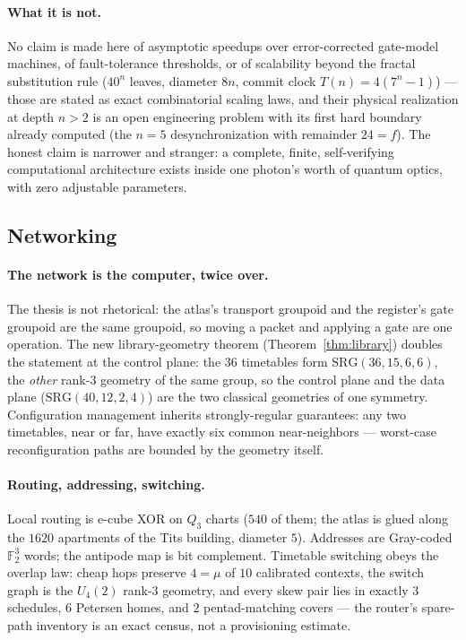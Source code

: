 \documentclass[11pt]{article}
\newcommand{\GF}[1]{\mathbb{F}_{#1}}
\begin{document}
\paragraph{What it is not.}  No claim is made here of asymptotic
speedups over error-corrected gate-model machines, of fault-tolerance
thresholds, or of scalability beyond the fractal substitution rule
($40^n$ leaves, diameter $8n$, commit clock $T(n)=4(7^n-1)$) ---
those are stated as exact combinatorial scaling laws, and their
physical realization at depth $n>2$ is an open engineering problem
with its first hard boundary already computed (the $n=5$
desynchronization with remainder $24=f$).  The honest claim is
narrower and stranger: a complete, finite, self-verifying
computational architecture exists inside one photon's worth of
quantum optics, with zero adjustable parameters.

\subsection{Networking}

\paragraph{The network is the computer, twice over.}  The thesis is
not rhetorical: the atlas's transport groupoid and the register's
gate groupoid are the same groupoid, so moving a packet and applying
a gate are one operation.  The new library-geometry theorem
(Theorem~\ref{thm:library}) doubles the statement at the control
plane: the $36$ timetables form $\mathrm{SRG}(36,15,6,6)$, the
\emph{other} rank-3 geometry of the same group, so the control plane
and the data plane ($\mathrm{SRG}(40,12,2,4)$) are the two classical
geometries of one symmetry.  Configuration management inherits
strongly-regular guarantees: any two timetables, near or far, have
exactly six common near-neighbors --- worst-case reconfiguration
paths are bounded by the geometry itself.

\paragraph{Routing, addressing, switching.}  Local routing is e-cube
XOR on $Q_3$ charts ($540$ of them; the atlas is glued along the
$1620$ apartments of the Tits building, diameter $5$).  Addresses
are Gray-coded $\GF2^3$ words; the antipode map is bit complement.
Timetable switching obeys the overlap law: cheap hops preserve
$4=\mu$ of $10$ calibrated contexts, the switch graph is the
$U_4(2)$ rank-3 geometry, and every skew pair lies in exactly $3$
schedules, $6$ Petersen homes, and $2$ pentad-matching covers ---
the router's spare-path inventory is an exact census, not a
provisioning estimate.
\end{document}
